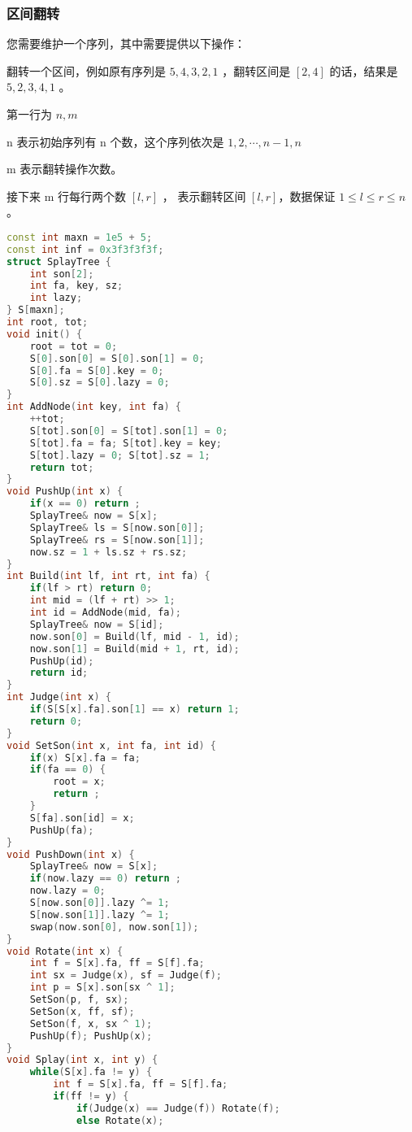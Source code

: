 \subsubsection{区间翻转}

您需要维护一个序列，其中需要提供以下操作：

翻转一个区间，例如原有序列是 $5, 4, 3, 2, 1$ ，翻转区间是 $[2, 4]$ 的话，结果是 $5, 2, 3, 4, 1$ 。

第一行为 $n, m$

n 表示初始序列有 n 个数，这个序列依次是 $1, 2, \cdots, n − 1, n$

m 表示翻转操作次数。

接下来 m 行每行两个数 $[l, r]$ ， 表示翻转区间 $[l, r]$，数据保证 $1 \le l \le r \le n$ 。

\begin{lstlisting}[language=C++]
const int maxn = 1e5 + 5;
const int inf = 0x3f3f3f3f;
struct SplayTree {
    int son[2];
    int fa, key, sz;
    int lazy;
} S[maxn];
int root, tot;
void init() {
    root = tot = 0;
    S[0].son[0] = S[0].son[1] = 0;
    S[0].fa = S[0].key = 0;
    S[0].sz = S[0].lazy = 0;
}
int AddNode(int key, int fa) {
    ++tot;
    S[tot].son[0] = S[tot].son[1] = 0;
    S[tot].fa = fa; S[tot].key = key;
    S[tot].lazy = 0; S[tot].sz = 1;
    return tot;
}
void PushUp(int x) {
    if(x == 0) return ;
    SplayTree& now = S[x];
    SplayTree& ls = S[now.son[0]];
    SplayTree& rs = S[now.son[1]];
    now.sz = 1 + ls.sz + rs.sz;
}
int Build(int lf, int rt, int fa) {
    if(lf > rt) return 0;
    int mid = (lf + rt) >> 1;
    int id = AddNode(mid, fa);
    SplayTree& now = S[id];
    now.son[0] = Build(lf, mid - 1, id);
    now.son[1] = Build(mid + 1, rt, id);
    PushUp(id);
    return id;
}
int Judge(int x) {
    if(S[S[x].fa].son[1] == x) return 1;
    return 0;
}
void SetSon(int x, int fa, int id) {
    if(x) S[x].fa = fa;
    if(fa == 0) {
        root = x;
        return ;
    }
    S[fa].son[id] = x;
    PushUp(fa);
}
void PushDown(int x) {
    SplayTree& now = S[x];
    if(now.lazy == 0) return ;
    now.lazy = 0;
    S[now.son[0]].lazy ^= 1;
    S[now.son[1]].lazy ^= 1;
    swap(now.son[0], now.son[1]);
}
void Rotate(int x) {
    int f = S[x].fa, ff = S[f].fa;
    int sx = Judge(x), sf = Judge(f);
    int p = S[x].son[sx ^ 1];
    SetSon(p, f, sx);
    SetSon(x, ff, sf);
    SetSon(f, x, sx ^ 1);
    PushUp(f); PushUp(x);
}
void Splay(int x, int y) {
    while(S[x].fa != y) {
        int f = S[x].fa, ff = S[f].fa;
        if(ff != y) {
            if(Judge(x) == Judge(f)) Rotate(f);
            else Rotate(x);

\end{lstlisting}
